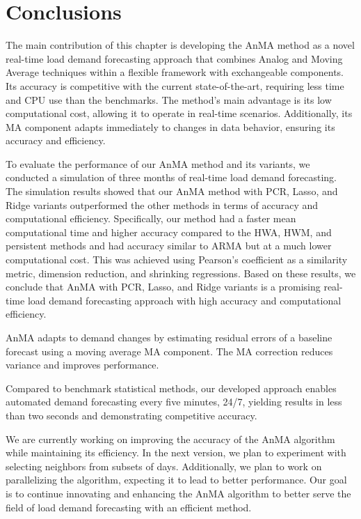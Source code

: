 \section{Conclusions}
The main contribution of this chapter is developing the AnMA method as a novel real-time load demand forecasting approach that combines Analog and Moving Average techniques within a flexible framework with exchangeable components. Its accuracy is competitive with the current state-of-the-art, requiring less time and CPU use than the benchmarks. The method's main advantage is its low computational cost, allowing it to operate in real-time scenarios. Additionally, its MA component adapts immediately to changes in data behavior, ensuring its accuracy and efficiency.

To evaluate the performance of our AnMA method and its variants, we conducted a simulation of three months of real-time load demand forecasting. The simulation results showed that our AnMA method with PCR, Lasso, and Ridge variants outperformed the other methods in terms of accuracy and computational efficiency. Specifically, our method had a faster mean computational time and higher accuracy compared to the HWA, HWM, and persistent methods and had accuracy similar to ARMA but at a much lower computational cost. This was achieved using Pearson's coefficient as a similarity metric, dimension reduction, and shrinking regressions. Based on these results, we conclude that AnMA with PCR, Lasso, and Ridge variants is a promising real-time load demand forecasting approach with high accuracy and computational efficiency.

AnMA adapts to demand changes by estimating residual errors of a baseline forecast using a moving average MA component. The MA correction reduces variance and improves performance.

Compared to benchmark statistical methods, our developed approach enables automated demand forecasting every five minutes, 24/7, yielding results in less than two seconds and demonstrating competitive accuracy.

We are currently working on improving the accuracy of the AnMA algorithm while maintaining its efficiency. In the next version, we plan to experiment with selecting neighbors from subsets of days. Additionally, we plan to work on parallelizing the algorithm, expecting it to lead to better performance. Our goal is to continue innovating and enhancing the AnMA algorithm to better serve the field of load demand forecasting with an efficient method.

